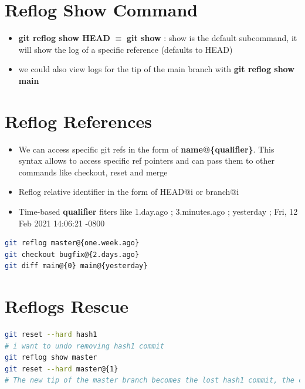 \documentclass{report}
\begin{document}
\section{Reflog Show Command}

\begin{itemize}
	\item \textbf{git reflog show HEAD} $\equiv$ \textbf{git show} : show is the default subcommand, it will show the log of a specific reference (defaults to HEAD) 
	\item we could also view logs for the tip of the main branch with \textbf{git reflog show main} 
\end{itemize}

\section{Reflog References}

\begin{itemize}
	\item We can access specific git refs in the form of \textbf{name@\{qualifier\}}. This syntax allows to access specific ref pointers and can pass them to other commands like checkout, reset and merge
	\item Reflog relative identifier in the form of HEAD@{i} or branch@{i} 
	\item Time-based \textbf{qualifier} fiters like 1.day.ago ; 3.minutes.ago ; yesterday ; Fri, 12 Feb 2021 14:06:21 -0800
\end{itemize}

\begin{tcolorbox}[title=Time-Based Examples,colback=backcolour]
\begin{lstlisting}[language=bash]
git reflog master@{one.week.ago}
git checkout bugfix@{2.days.ago}
git diff main@{0} main@{yesterday}
\end{lstlisting}
\end{tcolorbox}

\section{Reflogs Rescue}

\begin{tcolorbox}[title=Rescuing,colback=backcolour]
\begin{lstlisting}[language=bash]
git reset --hard hash1
# i want to undo removing hash1 commit
git reflog show master
git reset --hard master@{1}
# The new tip of the master branch becomes the lost hash1 commit, the commit is back !
\end{lstlisting}
\end{tcolorbox}
\end{document}

